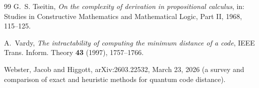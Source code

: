 \documentclass[11pt]{amsart}
\theoremstyle{plain}
\theoremstyle{definition}
\theoremstyle{remark}
\begin{document}
\begin{thebibliography}{99}
G.~S. Tseitin,
\emph{On the complexity of derivation in propositional calculus},
in: Studies in Constructive Mathematics and Mathematical Logic, Part II,
1968, 115--125.

A.~Vardy,
\emph{The intractability of computing the minimum distance of a code},
IEEE Trans. Inform. Theory \textbf{43} (1997), 1757--1766.

Webster, Jacob and Higgott,
arXiv:2603.22532, March 23, 2026 (a survey and comparison of exact and
heuristic methods for quantum code distance).

\end{thebibliography}
\end{document}

